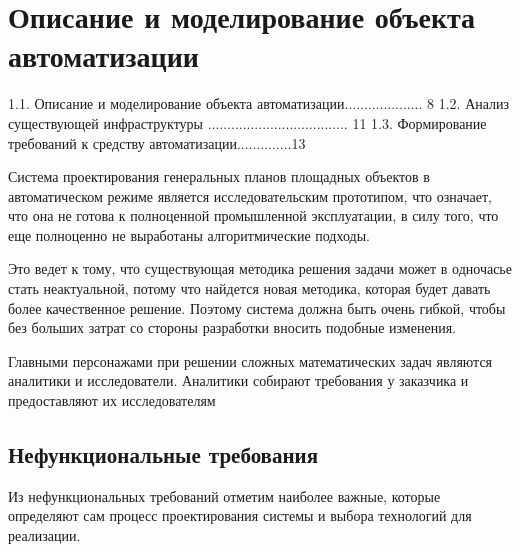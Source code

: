 \section*{\large{Описание и моделирование объекта автоматизации}}

1.1. Описание и моделирование объекта автоматизации.................... 8
1.2. Анализ существующей инфраструктуры .................................... 11
1.3. Формирование требований к средству автоматизации..............13

Система проектирования генеральных планов площадных объектов в автоматическом режиме
является исследовательским прототипом, что означает, что она не готова к полноценной промышленной эксплуатации,
в силу того, что еще полноценно не выработаны алгоритмические подходы.

Это ведет к тому, что существующая методика решения задачи может в одночасье стать неактуальной,
потому что найдется новая методика, которая будет давать более качественное решение.
Поэтому система должна быть очень гибкой, чтобы без больших затрат со стороны разработки вносить подобные изменения.

Главными персонажами при решении сложных математических задач являются аналитики и исследователи.
Аналитики собирают требования у заказчика и предоставляют их исследователям



\subsection*{\large{Нефункциональные требования}}

Из нефункциональных требований отметим наиболее важные, которые определяют сам процесс проектирования системы
и выбора технологий для реализации.

